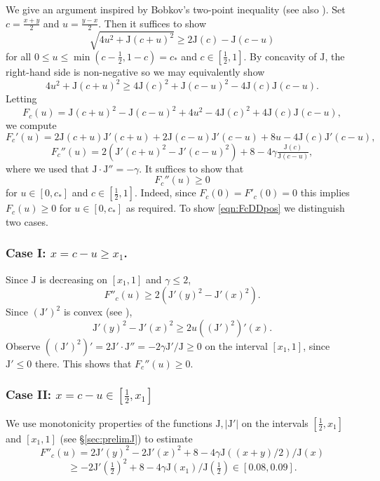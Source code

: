 \documentclass[11pt]{amsart}
\theoremstyle{plain}
\theoremstyle{definition}
\theoremstyle{remark}
\numberwithin{equation}{section}
\begin{document}
We give an argument
inspired by Bobkov's two-point inequality \cite{Bob97} (see also \cite[Prop. 3.3]{DIR24}).
Set $c=\tfrac{x+y}{2}$ and $u=\tfrac{y-x}{2}$. Then
it suffices to show
\[ \sqrt{4u^2 + {\mathrm{J}}(c+u)^2} \ge 2 {\mathrm{J}}( c) - {\mathrm{J}}(c-u)\]
for all $0\le u\le \min(c-\frac12,1-c)=c_*$ and $c \in [\frac12, 1]$.
By concavity of ${\mathrm{J}}$, the right-hand side is non-negative so we may equivalently show
\[4u^2 + {\mathrm{J}}(c+u)^2 \ge 4 {\mathrm{J}}(c)^2 + {\mathrm{J}}(c-u)^2 -4 {\mathrm{J}}(c){\mathrm{J}}(c-u).\]
Letting
\[F_c(u) = {\mathrm{J}}(c+u)^2 - {\mathrm{J}}(c-u)^2 + 4u^2 - 4 {\mathrm{J}}( c)^2 +4 {\mathrm{J}}(c){\mathrm{J}}(c-u), \]
we compute
\[F_c'(u) = 2 {\mathrm{J}}(c+u){\mathrm{J}}'(c+u) + 2{\mathrm{J}}(c-u){\mathrm{J}}'(c-u) +8u -4{\mathrm{J}}(c){\mathrm{J}}'(c-u),\]
\[F_c''(u) = 2 ({\mathrm{J}}'(c+u)^2-{\mathrm{J}}'(c-u)^2) + 8 - 4\gamma\tfrac{{\mathrm{J}}(c)}{{\mathrm{J}}(c-u)},\]
where we used that ${\mathrm{J}}\cdot {\mathrm{J}}'' = -\gamma$.
It suffices to show that
\begin{equation}\label{eqn:FcDDpos}
F_c''(u) \ge 0
\end{equation}
for $u\in [0,c_*]$ and $c\in [\frac12, 1]$.
Indeed, since $F_c(0)=F'_c(0)=0$ this implies $F_c(u)\ge 0$ for $u\in [0,c_*]$ as required.
To show \eqref{eqn:FcDDpos} we distinguish two cases.

\subsubsection*{\texorpdfstring{Case I: $x=c-u\ge x_1$.}{Case I}}
Since ${\mathrm{J}}$ is decreasing on $[x_1, 1]$ and $\gamma\le 2$,
\[ F''_c(u) \ge 2 ({\mathrm{J}}'(y)^2-{\mathrm{J}}'(x)^2) .\]
Since $({\mathrm{J}}')^2$ is convex (see \cite[Lemma 3.2]{DIR24}),
\[ {\mathrm{J}}'(y)^2 - {\mathrm{J}}'(x)^2 \ge 2u (({\mathrm{J}}')^2)'(x). \]
Observe $(({\mathrm{J}}')^2)' = 2 {\mathrm{J}}' \cdot {\mathrm{J}}'' = - 2 \gamma {\mathrm{J}}' / {\mathrm{J}} \ge 0$ on the interval $[x_1,1]$, since ${\mathrm{J}}'\le 0$ there. This shows that $F_c''(u)\ge 0$.

\subsubsection*{\texorpdfstring{Case II: $x=c-u\in [\frac12, x_1]$}{Case II}}
We use monotonicity properties of the functions ${\mathrm{J}},|{\mathrm{J}}'|$ on the intervals $[\frac12, x_1]$ and $[x_1,1]$ (see \S \ref{sec:prelimJ}) to estimate
\[ F''_c(u) = 2{\mathrm{J}}'(y)^2 - 2{\mathrm{J}}'(x)^2 + 8 - 4 \gamma {\mathrm{J}}((x+y)/2)/{\mathrm{J}}(x) \]
\[ \ge -2{\mathrm{J}}'(\tfrac12)^2 + 8 - 4\gamma {\mathrm{J}}(x_1)/{\mathrm{J}}(\tfrac12)\in [0.08, 0.09]. \]
\end{document}
